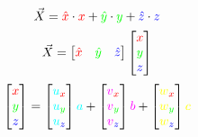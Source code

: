 \documentclass[preview]{standalone}
\begin{document}
$$\vec{X} = \textcolor[HTML]{FF0000}{\hat{x}}\cdot \textcolor[HTML]{FF0000}{x} + \textcolor[HTML]{00FF00}{\hat{y}}\cdot \textcolor[HTML]{00FF00}{y} + \textcolor[HTML]{0000FF}{\hat{z}}\cdot \textcolor[HTML]{0000FF}{z}$$
$$\vec{X} = \begin{bmatrix}\textcolor[HTML]{FF0000}{\hat{x}}&\textcolor[HTML]{00FF00}{\hat{y}}&\textcolor[HTML]{0000FF}{\hat{z}}\end{bmatrix}\begin{bmatrix}\textcolor[HTML]{FF0000}{x}\\\textcolor[HTML]{00FF00}{y}\\\textcolor[HTML]{0000FF}{z}\end{bmatrix}$$
$$\begin{bmatrix}\textcolor[HTML]{FF0000}{x}\\\textcolor[HTML]{00FF00}{y}\\\textcolor[HTML]{0000FF}{z}\end{bmatrix} =
\begin{bmatrix}\textcolor[HTML]{00FFFF}{u}_{\textcolor[HTML]{FF0000}{x}}\\\textcolor[HTML]{00FFFF}{u}_{\textcolor[HTML]{00FF00}{y}}\\\textcolor[HTML]{00FFFF}{u}_{\textcolor[HTML]{0000FF}{z}}\end{bmatrix}\textcolor[HTML]{00FFFF}{a} +
\begin{bmatrix}\textcolor[HTML]{FF00FF}{v}_{\textcolor[HTML]{FF0000}{x}}\\\textcolor[HTML]{FF00FF}{v}_{\textcolor[HTML]{00FF00}{y}}\\\textcolor[HTML]{FF00FF}{v}_{\textcolor[HTML]{0000FF}{z}}\end{bmatrix}\textcolor[HTML]{FF00FF}{b} +
\begin{bmatrix}\textcolor[HTML]{FFFF00}{w}_{\textcolor[HTML]{FF0000}{x}}\\\textcolor[HTML]{FFFF00}{w}_{\textcolor[HTML]{00FF00}{y}}\\\textcolor[HTML]{FFFF00}{w}_{\textcolor[HTML]{0000FF}{z}}\end{bmatrix}\textcolor[HTML]{FFFF00}{c}$$
\end{document}

